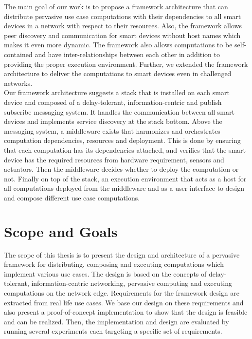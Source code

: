  \noindent The main goal of our work is to propose a framework architecture that can distribute  pervasive use case computations with their dependencies to all smart devices in a network with respect to their resources. Also, the framework allows peer discovery and communication for  smart devices without host names which makes it even more dynamic. The framework also allows computations to  be self-contained and have inter-relationships between each other in addition to providing the proper execution environment. Further, we extended the framework architecture to deliver the computations to smart devices even in challenged networks. \\
 
 \noindent Our framework architecture suggests a stack that is installed on each smart device
and composed of a delay-tolerant, information-centric and publish subscribe messaging
system. It handles the  communication between all smart devices and implements
service discovery at the stack bottom. Above the messaging system,  a middleware exists
that harmonizes and orchestrates computation dependencies, resources and
deployment. This is done by ensuring that each computation has its dependencies
attached, and verifies that the smart device has the required resources from hardware
requirement, sensors and actuators. Then the middleware decides whether to deploy
the computation or not. Finally on top of the stack, an execution environment that acts
as a host for all computations deployed from the middleware and as a user interface to
design and compose different use case computations.
 
\section{Scope and Goals}
The scope of this thesis is to present the design and architecture of a pervasive  framework for distributing, composing and executing computations which implement various use cases. The design is based on the concepts of delay-tolerant, information-centric networking, pervasive computing and executing computations on the network edge. Requirements for the framework design are extracted from real life use cases. We base our design on these requirements and also present a proof-of-concept implementation to show that the design is feasible and can be realized. Then, the implementation and design are evaluated by running several experiments each targeting a specific set of requirements.\\

